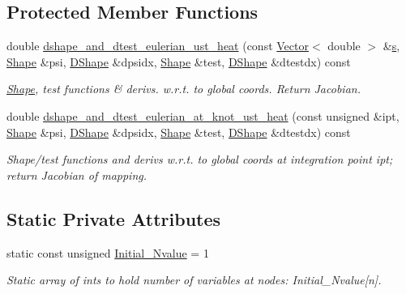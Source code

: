\subsection*{Protected Member Functions}
\begin{DoxyCompactItemize}
\item 
double \hyperlink{classoomph_1_1QUnsteadyHeatElement_a6ebc0c1826e01fbd03132b1617673ff7}{dshape\+\_\+and\+\_\+dtest\+\_\+eulerian\+\_\+ust\+\_\+heat} (const \hyperlink{classoomph_1_1Vector}{Vector}$<$ double $>$ \&\hyperlink{cfortran_8h_ab7123126e4885ef647dd9c6e3807a21c}{s}, \hyperlink{classoomph_1_1Shape}{Shape} \&psi, \hyperlink{classoomph_1_1DShape}{D\+Shape} \&dpsidx, \hyperlink{classoomph_1_1Shape}{Shape} \&test, \hyperlink{classoomph_1_1DShape}{D\+Shape} \&dtestdx) const
\begin{DoxyCompactList}\small\item\em \hyperlink{classoomph_1_1Shape}{Shape}, test functions \& derivs. w.\+r.\+t. to global coords. Return Jacobian. \end{DoxyCompactList}\item 
double \hyperlink{classoomph_1_1QUnsteadyHeatElement_ab9d47c020336e2c5accdca2014a5218e}{dshape\+\_\+and\+\_\+dtest\+\_\+eulerian\+\_\+at\+\_\+knot\+\_\+ust\+\_\+heat} (const unsigned \&ipt, \hyperlink{classoomph_1_1Shape}{Shape} \&psi, \hyperlink{classoomph_1_1DShape}{D\+Shape} \&dpsidx, \hyperlink{classoomph_1_1Shape}{Shape} \&test, \hyperlink{classoomph_1_1DShape}{D\+Shape} \&dtestdx) const
\begin{DoxyCompactList}\small\item\em Shape/test functions and derivs w.\+r.\+t. to global coords at integration point ipt; return Jacobian of mapping. \end{DoxyCompactList}\end{DoxyCompactItemize}
\subsection*{Static Private Attributes}
\begin{DoxyCompactItemize}
\item 
static const unsigned \hyperlink{classoomph_1_1QUnsteadyHeatElement_ad6279983f8f8301b1c3d9ec1160a53a0}{Initial\+\_\+\+Nvalue} = 1
\begin{DoxyCompactList}\small\item\em Static array of ints to hold number of variables at nodes\+: Initial\+\_\+\+Nvalue\mbox{[}n\mbox{]}. \end{DoxyCompactList}\end{DoxyCompactItemize}
